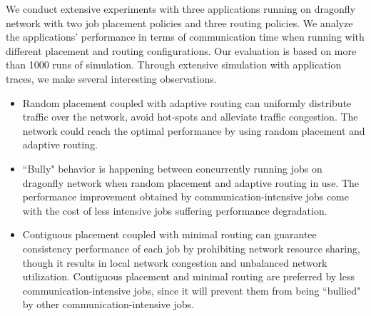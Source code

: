 \documentclass[conference,compsoc]{IEEEtran}
\begin{document}
We conduct extensive experiments with three applications running on dragonfly network with two job placement policies and three routing policies. We analyze the applications' performance in terms of communication time when running with different placement and routing configurations. Our evaluation is based on more than 1000 runs of simulation. Through extensive simulation with application traces, we make several interesting observations. 



\begin{itemize}
   
    \item Random placement coupled with adaptive routing can uniformly distribute traffic over the network, avoid hot-spots and alleviate traffic congestion. The network could reach the optimal performance by using random placement and adaptive routing. 

    \item ``Bully" behavior is happening between concurrently running jobs on dragonfly network when random placement and adaptive routing in use. The performance improvement obtained by communication-intensive jobs come with the cost of less intensive jobs suffering performance degradation.

    \item Contiguous placement coupled with minimal routing can guarantee consistency performance of each job by prohibiting network resource sharing, though it results in local network congestion and unbalanced network utilization. Contiguous placement and minimal routing are preferred by less communication-intensive jobs, since it will prevent them from being ``bullied" by other communication-intensive jobs.
    
\end{itemize}

\end{document}
